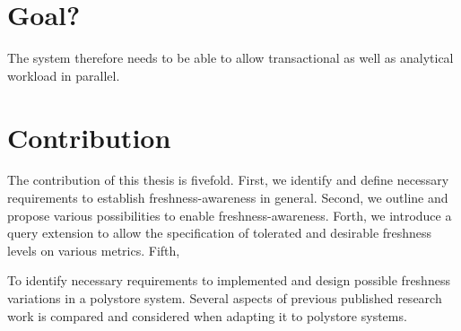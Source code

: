 
\section{Goal?}
The system therefore needs to be able to allow transactional as well as analytical workload in parallel. 




\section{Contribution}
The contribution of this thesis is fivefold. First, we identify and define necessary requirements to establish freshness-awareness in general.
Second, we outline and propose various possibilities to enable freshness-awareness. Forth, we introduce a query extension to allow the specification
of tolerated and desirable freshness levels on various metrics. Fifth, 

To identify necessary requirements to implemented and design possible 
freshness variations in a polystore system. Several aspects of previous published research work is compared and considered when adapting it to polystore systems.



